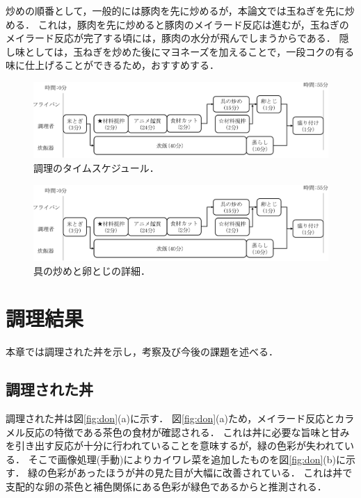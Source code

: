 炒めの順番として，一般的には豚肉を先に炒めるが，本論文では玉ねぎを先に炒める．
これは，豚肉を先に炒めると豚肉のメイラード反応は進むが，玉ねぎのメイラード反応が完了する頃には，豚肉の水分が飛んでしまうからである．
隠し味としては，玉ねぎを炒めた後にマヨネーズを加えることで，一段コクの有る味に仕上げることができるため，おすすめする．


\begin{figure}[ht]
\centering
\includegraphics[page=1, width=16.00000cm]{./fig/fig_bb.pdf}
\caption{調理のタイムスケジュール．\label{fig:time}}
\end{figure}


\begin{figure}[ht]
\centering
\includegraphics[page=2, width=12.00000cm]{./fig/fig_bb.pdf}
\caption{具の炒めと卵とじの詳細．\label{fig:flypan}}
\end{figure}

\clearpage

\section{調理結果}\label{ux8abfux7406ux7d50ux679c}

本章では調理された丼を示し，考察及び今後の課題を述べる．

\subsection{調理された丼}\label{ux8abfux7406ux3055ux308cux305fux4e3c}

調理された丼は図\ref{fig:don}(a)に示す．
図\ref{fig:don}(a)ため，メイラード反応とカラメル反応の特徴である茶色の食材が確認される．
これは丼に必要な旨味と甘みを引き出す反応が十分に行われていることを意味するが，緑の色彩が失われている．
そこで画像処理(手動)によりカイワレ菜を追加したものを図\ref{fig:don}(b)に示す．
緑の色彩があったほうが丼の見た目が大幅に改善されている．
これは丼で支配的な卵の茶色と補色関係にある色彩が緑色であるからと推測される．


